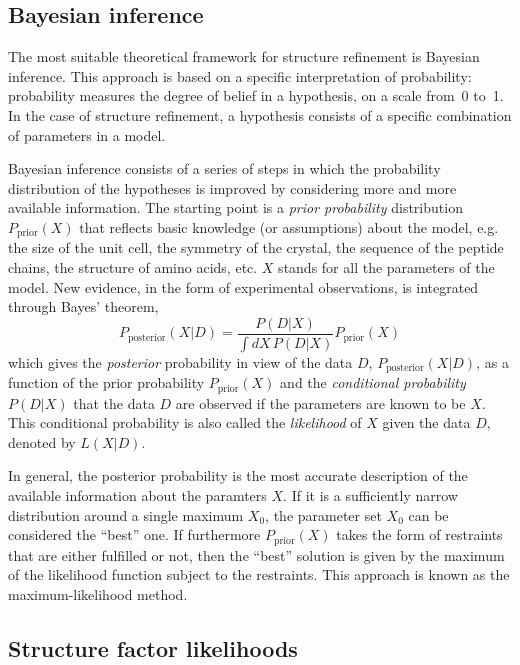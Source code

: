 \documentclass[12pt]{article}
\begin{document}
\begin{sloppy}
\subsection{Bayesian inference}

The most suitable theoretical framework for structure refinement is
Bayesian inference. This approach is based on a specific
interpretation of probability: probability measures the degree of
belief in a hypothesis, on a scale from~0 to~1. In the case of
structure refinement, a hypothesis consists of a specific combination
of parameters in a model.

Bayesian inference consists of a series of steps in which the
probability distribution of the hypotheses is improved by considering
more and more available information. The starting point is a
\textit{prior probability} distribution $P_{\mbox{prior}}(X)$ that
reflects basic knowledge (or assumptions) about the model, e.g. the
size of the unit cell, the symmetry of the crystal, the sequence of
the peptide chains, the structure of amino acids, etc. $X$ stands for
all the parameters of the model. New evidence, in the form of experimental
observations, is integrated through Bayes' theorem,
\begin{equation}
P_{\mbox{posterior}}(X|D) = \frac{P(D|X)}{\int dX\,P(D|X)} P_{\mbox{prior}}(X)
\end{equation}
which gives the \textit{posterior} probability in view of the data
$D$, $P_{\mbox{posterior}}(X|D)$, as a function of the prior probability
$P_{\mbox{prior}}(X)$ and the \textit{conditional probability} $P(D|X)$
that the data $D$ are observed if the parameters are known to be $X$.
This conditional probability is also called the \textit{likelihood}
of $X$ given the data $D$, denoted by $L(X|D)$.

In general, the posterior probability is the most accurate description
of the available information about the paramters $X$. If it is a
sufficiently narrow distribution around a single maximum $X_0$, the
parameter set $X_0$ can be considered the ``best'' one. If furthermore
$P_{\mbox{prior}}(X)$ takes the form of restraints that are either
fulfilled or not, then the ``best'' solution is given by the maximum
of the likelihood function subject to the restraints. This approach is
known as the maximum-likelihood method.

\subsection{Structure factor likelihoods}


\end{sloppy}
\end{document}
